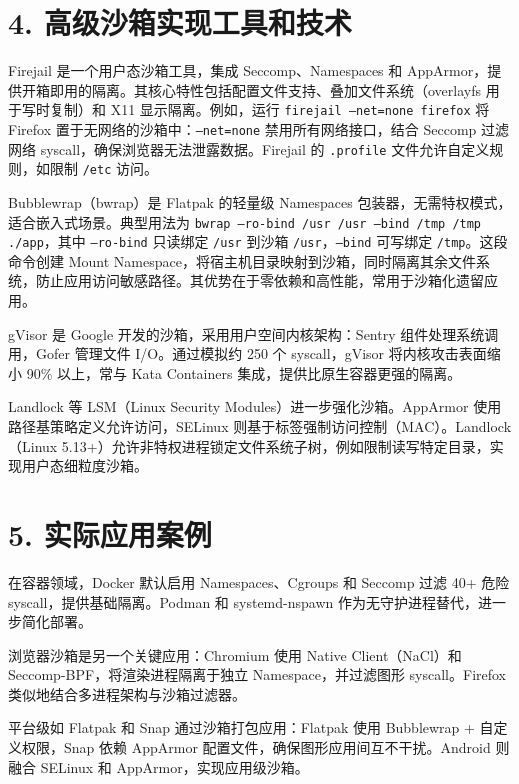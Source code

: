 \chapter{4. 高级沙箱实现工具和技术}
Firejail 是一个用户态沙箱工具，集成 Seccomp、Namespaces 和 AppArmor，提供开箱即用的隔离。其核心特性包括配置文件支持、叠加文件系统（overlayfs 用于写时复制）和 X11 显示隔离。例如，运行 \texttt{firejail --net=none firefox} 将 Firefox 置于无网络的沙箱中：\texttt{--net=none} 禁用所有网络接口，结合 Seccomp 过滤网络 syscall，确保浏览器无法泄露数据。Firejail 的 \texttt{.profile} 文件允许自定义规则，如限制 \texttt{/etc} 访问。\par
Bubblewrap（bwrap）是 Flatpak 的轻量级 Namespaces 包装器，无需特权模式，适合嵌入式场景。典型用法为 \texttt{bwrap --ro-bind /usr /usr --bind /tmp /tmp ./app}，其中 \texttt{--ro-bind} 只读绑定 \texttt{/usr} 到沙箱 \texttt{/usr}，\texttt{--bind} 可写绑定 \texttt{/tmp}。这段命令创建 Mount Namespace，将宿主机目录映射到沙箱，同时隔离其余文件系统，防止应用访问敏感路径。其优势在于零依赖和高性能，常用于沙箱化遗留应用。\par
gVisor 是 Google 开发的沙箱，采用用户空间内核架构：Sentry 组件处理系统调用，Gofer 管理文件 I/O。通过模拟约 250 个 syscall，gVisor 将内核攻击表面缩小 90\%{} 以上，常与 Kata Containers 集成，提供比原生容器更强的隔离。\par
Landlock 等 LSM（Linux Security Modules）进一步强化沙箱。AppArmor 使用路径基策略定义允许访问，SELinux 则基于标签强制访问控制（MAC）。Landlock（Linux 5.13+）允许非特权进程锁定文件系统子树，例如限制读写特定目录，实现用户态细粒度沙箱。\par
\chapter{5. 实际应用案例}
在容器领域，Docker 默认启用 Namespaces、Cgroups 和 Seccomp 过滤 40+ 危险 syscall，提供基础隔离。Podman 和 systemd-nspawn 作为无守护进程替代，进一步简化部署。\par
浏览器沙箱是另一个关键应用：Chromium 使用 Native Client（NaCl）和 Seccomp-BPF，将渲染进程隔离于独立 Namespace，并过滤图形 syscall。Firefox 类似地结合多进程架构与沙箱过滤器。\par
平台级如 Flatpak 和 Snap 通过沙箱打包应用：Flatpak 使用 Bubblewrap + 自定义权限，Snap 依赖 AppArmor 配置文件，确保图形应用间互不干扰。Android 则融合 SELinux 和 AppArmor，实现应用级沙箱。\par
